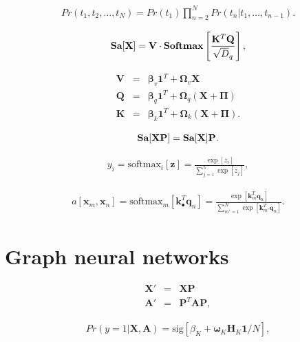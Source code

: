 \documentclass[letterpaper,twoside,openany, titlepage,oldfontcommands,titles,dvipsnames]{memoir}
\begin{document}
\begin{eqnarray}\label{eq:transformer_autoregressive}
  Pr(t_{1},t_{2},\ldots, t_{N}) = Pr(t_{1})\prod_{n=2}^{N}Pr(t_{n}|t_{1},\ldots, t_{n-1}).
 \end{eqnarray}

\begin{eqnarray}\label{eq:transformer_position_quad}
  \mbox{{\bf Sa}}[\mathbf{X}] =\mathbf{V}\cdot\mbox{\bf Softmax}\left[\frac{\mathbf{K}^{T}\mathbf{Q}}{\sqrt{D}_{q}}\right],
 \end{eqnarray}

\begin{eqnarray}
 \mathbf{V} &=& \boldsymbol\beta_{v}\mathbf{1}^{T}+\boldsymbol\Omega_{\textit{v}}\mathbf{X}\nonumber \\
 \mathbf{Q} &=& \boldsymbol\beta_{q}\mathbf{1}^{T}+\boldsymbol\Omega_{\textit{q}}(\mathbf{X}+\boldsymbol\Pi)\nonumber \\
 \mathbf{K} &=& \boldsymbol\beta_{k}\mathbf{1}^{T}+\boldsymbol\Omega_{\textit{k}}(\mathbf{X}+\boldsymbol\Pi).
 \end{eqnarray}



\begin{eqnarray}
     \mbox{\bf Sa}[\mathbf{X}\mathbf{P}] = \mbox{\bf Sa}[\mathbf{X}]\mathbf{P}.
 \end{eqnarray}

\begin{eqnarray}
 y_{i} = \mbox{softmax}_{i}[\mathbf{z}] = \frac{\exp[z_{i}]}{\sum_{j=1}^{5}\exp[z_{j}]},
 \end{eqnarray}

\begin{eqnarray}
  a[\mathbf{x}_{m},\mathbf{x}_{n}] = \mbox{softmax}_{m}\left[\mathbf{k}_{\bullet}^T\mathbf{q}_{n}\right]
  = \frac{\exp\left[\mathbf{k}_m^T\mathbf{q}_{n}\right]}{\sum_{m'=1}^{N}\exp\left[\mathbf{k}_{m'}^{T}\mathbf{q}_{n} \right]}.
 \end{eqnarray}

\chapter{Graph neural networks}

\begin{eqnarray}
  \mathbf{X}' &=& \mathbf{X}\mathbf{P}\nonumber \\
  \mathbf{A}' &=& \mathbf{P}^T\mathbf{A}\mathbf{P},
 \end{eqnarray}

\begin{eqnarray}\label{eq:graph_graph_level}
 Pr(y=1|\mathbf{X},\mathbf{A}) = \mbox{sig}\left[\beta_{K}+\boldsymbol\omega_{K}\mathbf{H}_{K}\mathbf{1}/N\right],
 \end{eqnarray}
\end{document}
